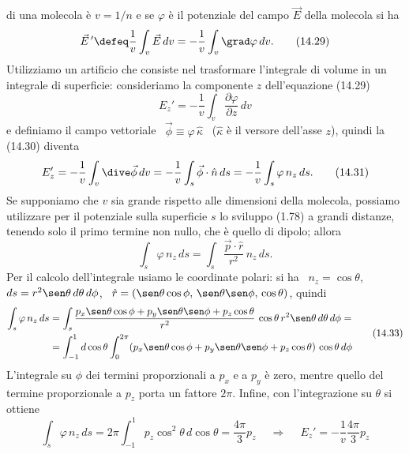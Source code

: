 di una molecola \`e $v=1/n$ e se $\varphi$ \`e il potenziale del campo $\vec E$
della molecola si ha
\begin{equation}
  \vec E\,'\defeq\frac{1}{v}\int_v\vec E\,dv=-\frac{1}{v}\int_v\grad\varphi\,dv.
  \tag{14.29}
\end{equation}
Utilizziamo un artificio che consiste nel trasformare l'integrale di volume in
un integrale di superficie: consideriamo la componente $z$ dell'equazione
(14.29)
\begin{equation}
  E_z'=-\frac{1}{v}\int_v\frac{\partial\varphi}{\partial z}\,dv
  \tag{14.30}
\end{equation}
e definiamo il campo vettoriale \ $\vec\phi\equiv\varphi\,\hat\kappa$
\ ($\hat\kappa$ \`e il versore dell'asse $z$), quindi la (14.30) diventa
\begin{equation}
  E_z'=-\frac{1}{v}\int_v\dive\vec\phi\,dv
  =-\frac{1}{v}\int_s\vec\phi\cdot\hat n\,ds=-\frac{1}{v}\int_s\varphi\,n_z\,ds.
  \tag{14.31}
\end{equation}
Se supponiamo che $v$ sia grande rispetto alle dimensioni della molecola,
possiamo utilizzare per il potenziale sulla superficie $s$ lo sviluppo (1.78) a
grandi distanze, tenendo solo il primo termine non nullo, che \`e quello di
dipolo; allora
\begin{equation}
  \int_s\varphi\,n_z\,ds=\int_s\frac{\vec p\cdot\hat r}{r^2}\,n_z\,ds.
  \tag{14.32}
\end{equation}
Per il calcolo dell'integrale usiamo le coordinate polari: si ha
\ $n_z=\cos\theta$, \ $ds=r^2\sen\theta\,d\theta\,d\phi$,
\ $\hat r=(\sen\theta\cos\phi,\,\sen\theta\sen\phi,\,\cos\theta)$, quindi
\begin{equation}
  \begin{aligned}
    \int_s\varphi\,n_z\,ds
    &=\int_s\frac{p_x\sen\theta\cos\phi+p_y\sen\theta\sen\phi+p_z\cos\theta}
    {r^2}\,\cos\theta\,r^2\sen\theta\,d\theta\,d\phi=\\
    &=\int_{-1}^1d\cos\theta\int_0^{2\pi}(p_x\sen\theta\cos\phi
    +p_y\sen\theta\sen\phi+p_z\cos\theta)\,\cos\theta\,d\phi
  \end{aligned}
  \tag{14.33}
\end{equation}
L'integrale su $\phi$ dei termini proporzionali a $p_x$ e a $p_y$ \`e zero,
mentre quello del termine proporzionale a $p_z$ porta un fattore $2\pi$. Infine,
con l'integrazione su $\theta$ si ottiene
\begin{equation}
  \int_s\varphi\,n_z\,ds=2\pi\int_{-1}^1p_z\cos^2\theta\,d\cos\theta
  =\frac{4\pi}{3}p_z\quad\ \Rightarrow\quad\ E_z'=-\frac{1}{v}\frac{4\pi}{3}p_z
  \tag{14.34}
\end{equation}

